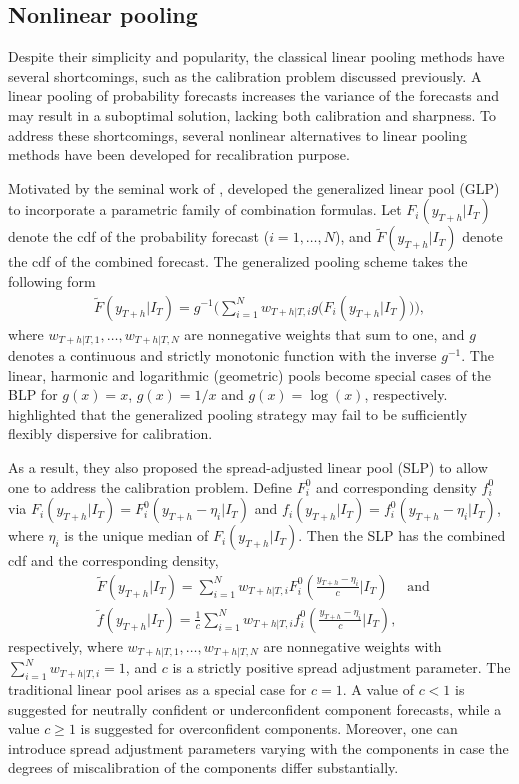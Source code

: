 \documentclass[11pt]{article}
\begin{document}
\subsection{Nonlinear pooling}
\label{sec:nonlinear_pooling}

Despite their simplicity and popularity, the classical linear pooling methods have several shortcomings, such as the calibration problem discussed previously. A linear pooling of probability forecasts increases the variance of the forecasts and may result in a suboptimal solution, lacking both calibration and sharpness. To address these shortcomings, several nonlinear alternatives to linear pooling methods have been developed for recalibration purpose.

Motivated by the seminal work of \citet{Dawid1995-jj}, \citet{Gneiting2013-hl} developed the generalized linear pool (GLP) to incorporate a parametric family of combination formulas. Let $F_{i}(y_{T+h}|I_{T})$ denote the cdf of the probability forecast ($i=1,\dots,N$), and $\tilde{F}(y_{T+h}|I_{T})$ denote the cdf of the combined forecast. The generalized pooling scheme takes the following form
\begin{align*}
  \tilde{F}(y_{T+h}|I_{T}) = g^{-1}\bigg(\sum_{i=1}^{N} w_{T+h|T,i} g\big(F_{i}(y_{T+h}|I_{T})\big)\bigg),
\end{align*}
where $w_{T+h|T,1},\dots,w_{T+h|T,N}$ are nonnegative weights that sum to one, and $g$ denotes a continuous and strictly monotonic function with the inverse $g^{-1}$. The linear, harmonic and logarithmic (geometric) pools become special cases of the BLP for $g(x)=x$, $g(x)=1/x$ and $g(x)=\log(x)$, respectively. \citet{Gneiting2013-hl} highlighted that the generalized pooling strategy may fail to be sufficiently flexibly dispersive for calibration.

As a result, they also proposed the spread-adjusted linear pool (SLP) to allow one to address the calibration problem. Define $F_{i}^{0}$ and corresponding density $f_{i}^{0}$ via $F_{i}(y_{T+h}|I_{T})=F_{i}^{0}(y_{T+h}-\eta_{i}|I_{T})$ and $f_{i}(y_{T+h}|I_{T})=f_{i}^{0}(y_{T+h}-\eta_{i}|I_{T})$, where $\eta_{i}$ is the unique median of $F_{i}(y_{T+h}|I_{T})$. Then the SLP has the combined cdf and the corresponding density,
\begin{align*}
   & \tilde{F}(y_{T+h}|I_{T})=\sum_{i=1}^{N} w_{T+h|T,i} F_{i}^{0}\left(\frac{y_{T+h}-\eta_{i}}{c}\bigg|I_{T}\right) \quad \text { and } \\
   & \tilde{f}(y_{T+h}|I_{T})=\frac{1}{c} \sum_{i=1}^{N} w_{T+h|T,i} f_{i}^{0}\left(\frac{y_{T+h}-\eta_{i}}{c}\bigg|I_{T}\right),
\end{align*}
respectively, where $w_{T+h|T,1},\dots,w_{T+h|T,N}$ are nonnegative weights with $\sum_{i=1}^{N}w_{T+h|T,i}=1$, and $c$ is a strictly positive spread adjustment parameter. The traditional linear pool arises as a special case for $c = 1$. A value of $c < 1$ is suggested for neutrally confident or underconfident component forecasts, while a value $c \geq 1$ is suggested for overconfident components. Moreover, one can introduce spread adjustment parameters varying with the components in case the degrees of miscalibration of the components differ substantially.
\end{document}
